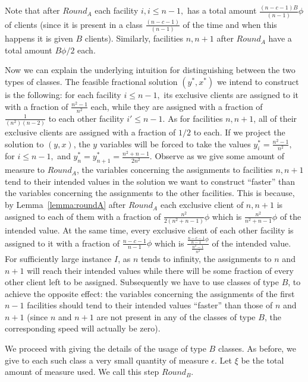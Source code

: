 \documentclass[11pt]{article}\usepackage{amsmath}
\begin{document}
Note that  after $Round_A$ each  facility $i, i  \leq n-1,$ has  a total
amount $ \frac{(n-c-1)B}{(n-1)} \phi$  of clients (since it is present
in a class  $\frac{(n-c-1)}{(n-1)}$ of the time and  when this happens
it is  given $B$ clients).  Similarly, facilities $n,n+1$  after $Round_A$
have a total amount $B\phi /2$ each.

Now we can explain the underlying intuition for distinguishing between
the two
types of classes.  The feasible fractional solution $(y^*,x^*)$
we  intend to  construct is  the following:  for each
facility $ i\leq n-1,$ its exclusive clients are assigned to it with
a fraction of $\frac{n^2-1}{n^2}$ each, while they are assigned with a
fraction of $\frac{1}{(n^2)(n-2)}$ to  each other facility $ i'
\leq  n-1$. As  for facilities  $n,n+1$, all  of their exclusive  clients are
assigned with a fraction of $1/2$  to each.  If  we  project  the solution  to  
 $(y,x)$, the $y$ variables will be forced 
to  take   the  values
$y^*_i=\frac{n^2-1}{n^2},$ for $i \leq n-1,$ and $y^*_n=y^*_{n+1}=\frac{n^2+n-1}{2n^2}$. Observe as we give some  amount of  measure to  $Round_A$,
 the  variables  concerning the
assignments to facilities $n,n+1$ tend to their intended values in the
solution we want to construct ``faster'' than the variables concerning the
assignments to the other facilities. This is because, by Lemma~\ref{lemma:roundA}
after $Round_A$ each exclusive client  of $n,n+1$ is assigned to each of them with
a fraction of $\frac{n^2}{2(n^2+n-1)} \phi$ which is $\frac{n^2}{n^2+n-1}
\phi$ of  the intended value. At the  same time, every
exclusive  client of  each other  facility is  assigned to  it  with a
fraction of $\frac{n-c-1}{n-1} \phi$ which is $\frac{\frac{n-c-1}{n-1}
  \phi}{\frac{n^2-1}{n^2}}$  of the  intended value.  For sufficiently
large  instance  $I$,  as  $n$  tends  to  infinity,  the  assignments
to $n$ and $n+1$ will reach their intended values while there will
be   some    fraction   of   every    other   client   left    to   be
assigned. Subsequently we have to use classes of type $B$, 
to achieve the opposite effect: the
variables  concerning the  assignments of  the first  $n-1$ facilities
should tend
to their intended values ``faster''  than those of $n$ and $n+1$ (since
$n$ and $n+1$  are 
not  present in  any of  the classes  of type  $B$,  the corresponding
speed will actually be zero).

We  proceed  with  giving  the  details  of  the  usage  of  type  $B$
classes. As before,  we give to each such class  a very small quantity
of  measure $\epsilon$.  Let  $\xi$  be the  total  amount of  measure
used. We call this step $Round_B$.
\end{document}
